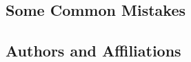 \documentclass[conference]{IEEEtran}
\begin{document}
\subsection{Some Common Mistakes}\label{SCM}

\subsection{Authors and Affiliations}\label{AAA}
\end{document}

